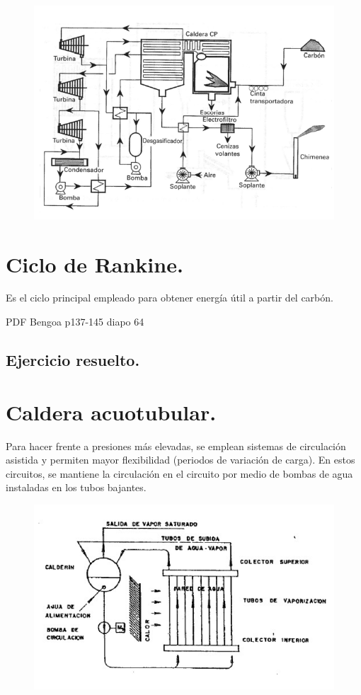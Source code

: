 \begin{figure}[H]
	\centering
	\includegraphics[width=0.7\linewidth]{res/tema10/awaVapor}
	\label{fig:colectormixto}
\end{figure}

\section{Ciclo de Rankine.}
Es el ciclo principal empleado para obtener energía útil a partir del carbón.

PDF Bengoa p137-145
diapo 64
\subsection{Ejercicio resuelto.}
\section{Caldera acuotubular.}
Para hacer frente a presiones más elevadas, se emplean sistemas de circulación asistida y permiten mayor flexibilidad (periodos de variación de carga). En estos circuitos, se mantiene la circulación en el circuito por medio de bombas de agua instaladas en los tubos bajantes.
\begin{figure}[H]
	\centering
	\includegraphics[width=0.7\linewidth]{res/tema10/autotubu}
	\label{fig:autotubu}
\end{figure}



